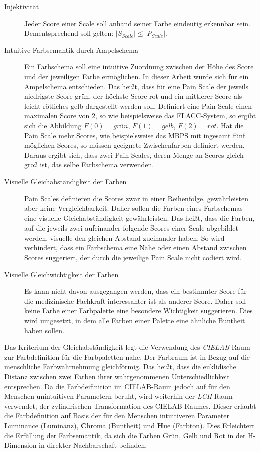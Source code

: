 \begin{description}
\item[Injektivität] Jeder Score einer Scale soll anhand seiner Farbe eindeutig erkennbar sein. Dementsprechend soll gelten: $|S_{Scale}| \leq |P_{Scale}|$.
\item[Intuitive Farbsemantik durch Ampelschema] Ein Farbschema soll eine intuitive Zuordnung zwischen der Höhe des Score und der jeweiligen Farbe ermöglichen. In dieser Arbeit wurde sich für ein Ampelschema entschieden. Das heißt, dass für eine Pain Scale der jeweils niedrigste Score \glqq grün\grqq{}, der höchste Score \glqq rot\grqq{} und ein \glqq mittlerer\grqq{} Score als \glqq leicht rötliches gelb\grqq{} dargestellt werden soll. Definiert eine Pain Scale einen maximalen Score von 2, so wie beispielsweise das FLACC-System, so ergibt sich die Abbildung $F(0) =  grün$, $F(1) = gelb$, $F(2) = rot$. Hat die Pain Scale mehr Scores, wie beispielsweise das MBPS mit ingesamt fünf möglichen Scores, so müssen geeignete Zwischenfarben definiert werden. Daraus ergibt sich, dass zwei Pain Scales, deren Menge an Scores gleich groß ist, das selbe Farbschema verwenden.
\item[Visuelle Gleichabständigkeit der Farben] Pain Scales definieren die Scores zwar in einer Reihenfolge, gewährleisten aber keine Vergleichbarkeit. Daher sollen die Farben eines Farbschemas eine visuelle Gleichabständigkeit gewährleisten. Das heißt, dass die Farben, auf die jeweils zwei aufeinander folgende Scores einer Scale abgebildet werden, visuelle den gleichen Abstand zueinander haben. So wird verhindert, dass ein Farbschema eine Nähe oder einen Abstand zwischen Scores suggeriert, der durch die jeweilige Pain Scale nicht codiert wird. 
\item[Visuelle Gleichwichtigkeit der Farben] Es kann nicht davon ausgegangen werden, dass ein bestimmter Score für die medizinische Fachkraft interessanter ist als anderer Score. Daher soll keine Farbe einer Farbpalette eine besondere Wichtigkeit suggerieren. Dies wird umgesetzt, in dem alle Farben einer Palette eine ähnliche Buntheit haben sollen.\cite{bigman}
\end{description}

Das Kriterium der Gleichabständigkeit legt die Verwendung des \emph{CIELAB}-Raum zur Farbdefinition für die Farbpaletten nahe. Der Farbraum ist in Bezug auf die menschliche Farbwahrnehmung \glqq  gleichförmig\grqq. Das heißt, dass die euklidische Distanz zwischen zwei Farben ihrer wahrgenommenen Unterschiedlichkeit entsprechen. Da die Farbdeifinition im CIELAB-Raum jedoch auf für den Menschen unintuitiven Parametern beruht, wird weiterhin der \emph{LCH}-Raum verwendet, der zylindrischen Transformation des CIELAB-Raumes. Dieser erlaubt die Farbdefinition auf Basis der für den Menschen intuitiveren Parameter \textbf{L}uminance (Luminanz), \textbf{C}hroma (Buntheit) und \textbf{H}ue (Farbton). Dies Erleichtert die Erfüllung der Farbsemantik, da sich die Farben Grün, Gelb und Rot in der H-Dimension in direkter Nachbarschaft befinden.\cite{palettes}\cite{johnstone}


